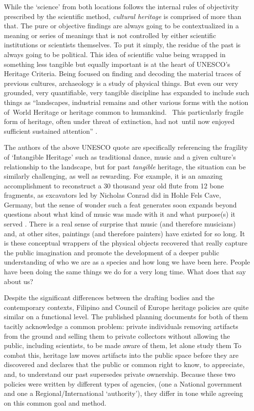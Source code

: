 \documentclass[spanish]{ijsra}
\begin{document}
While the ‘science’ from both locations follows the internal rules of objectivity prescribed by the scientific method, \textit{cultural heritage} is comprised of more than that. The pure or objective findings are always going to be contextualized in a meaning or series of meanings that is not controlled by either scientific institutions or scientists themselves. To put it simply, the residue of the past is always going to be political. This idea of scientific value being wrapped in something less tangible but equally important is at the heart of UNESCO’s Heritage Criteria. Being focused on finding and decoding the material traces of previous cultures, archaeology is a study of physical things. But even our very grounded, very quantifiable, very tangible discipline has expanded to include such things as “landscapes, industrial remains and other various forms with the notion of World Heritage or heritage common to humankind.  This particularly fragile form of heritage, often under threat of extinction, had not until now enjoyed sufficient sustained attention” 
\parencite{UNESCO2015}. 

The authors of the above UNESCO quote are specifically referencing the fragility of ‘Intangible Heritage’ such as traditional dance, music and a given culture’s relationship to the landscape, but for past \textit{tangible} heritage, the situation can be similarly challenging, as well as rewarding. 
For example, it is an amazing accomplishment to reconstruct a \num{30} thousand year old flute from \num{12} bone fragments, as excavators led by Nicholas Conrad did in Hohle Fels Cave, Germany, but the sense of wonder such a feat generates soon expands beyond questions about what kind of music was made with it and what purpose(s) it served \parencite{conard2009}. 
There is a real sense of surprise that music (and therefore musicians) and, at other sites, paintings (and therefore painters) have existed for so long. It is these conceptual wrappers of the physical objects recovered that really capture the public imagination and promote the development of a deeper public understanding of who we are as a species and how long we have been here. People have been doing the same things we do for a very long time. What does that say about us?

Despite the significant differences between the drafting bodies and the contemporary contexts, Filipino and Council of Europe heritage policies are quite similar on a functional level. The published planning documents for both of them tacitly acknowledge a common problem: private individuals removing artifacts from the ground and selling them to private collectors without allowing the public, including scientists, to be made aware of them, let alone study them %
To combat this, heritage law moves artifacts into the public space before they are discovered and declares that the public or common right to know, to appreciate, and, to understand our past supersedes private ownership. Because these two policies were written by different types of agencies, (one a National government and one a Regional/International ‘authority’), they differ in tone while agreeing on this common goal and method. 
\end{document}
